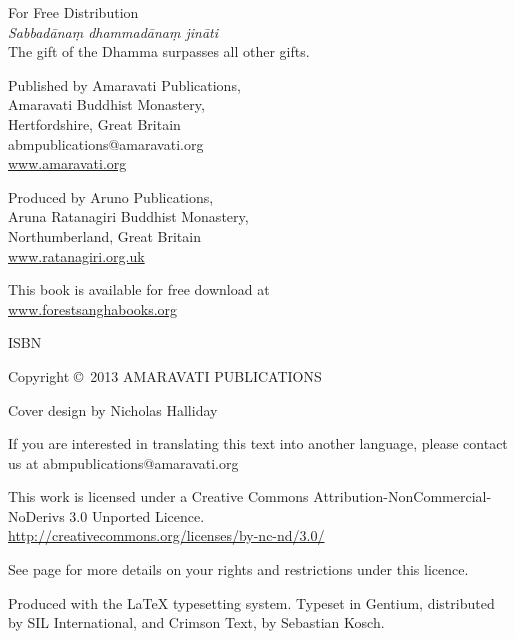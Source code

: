 
\thispagestyle{empty}

{\small\setlength{\parskip}{0.8em}\setlength{\parindent}{0em}%
{\raggedright%

\thetitle

For Free Distribution\\
\emph{Sabbadānaṃ dhammadānaṃ jināti}\\
The gift of the Dhamma surpasses all other gifts.

Published by Amaravati Publications,\\
Amaravati Buddhist Monastery,\\
Hertfordshire, Great Britain\\
abmpublications@amaravati.org\\
\href{http://amaravati.org}{www.amaravati.org}

Produced by Aruno Publications,\\
Aruna Ratanagiri Buddhist Monastery,\\
Northumberland, Great Britain\\
\href{http://ratanagiri.org.uk/}{www.ratanagiri.org.uk}

This book is available for free download at\\
\href{http://forestsanghabooks.org/}{www.forestsanghabooks.org}

ISBN \theISBN

Copyright \copyright\ 2013 AMARAVATI PUBLICATIONS

Cover design by Nicholas Halliday

\vfill

{\footnotesize
If you are interested in translating this text into another language, please contact us at abmpublications@amaravati.org

This work is licensed under a Creative Commons Attribution-NonCommercial-NoDerivs 3.0 Unported Licence.\\
\href{http://creativecommons.org/licenses/by-nc-nd/3.0/}{http://creativecommons.org/licenses/by-nc-nd/3.0/}

See page \pageref{copyright-details} for more details on your rights and restrictions under this licence.

Produced with the {\selectfont\LaTeX} typesetting system. Typeset in Gentium, distributed by SIL International, and Crimson Text, by Sebastian Kosch.

\theEditionInfo

}

}}

